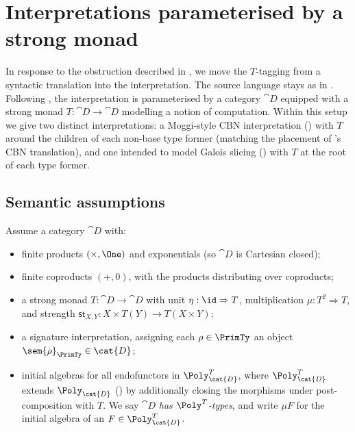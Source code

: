 \section{Interpretations parameterised by a strong monad}
\label{sec:slicing-interpretation}

In response to the obstruction described in , we move the
$T$-tagging from a syntactic translation into the interpretation. The source language stays as in
. Following \citet{notions-of-computation}, the interpretation is
parameterised by a category $\cat{D}$ equipped with a strong monad $T : \cat{D} \to \cat{D}$
modelling a notion of computation. Within this setup we give two distinct interpretations: a Moggi-style CBN interpretation
() with $T$ around the children of each non-base type former
(matching the placement of 's CBN translation), and one intended
to model Galois slicing () with $T$ at the root of each type
former.

\subsection{Semantic assumptions}
\label{sec:slicing-interpretation:assumptions}

Assume a category $\cat{D}$ with:
\begin{itemize}
\item finite products $(\times, \One)$ and exponentials (so $\cat{D}$ is Cartesian closed);
\item finite coproducts $(+, 0)$, with the products distributing over coproducts;
\item a strong monad $T : \cat{D} \to \cat{D}$ with unit $\eta : \id \Rightarrow T$, multiplication
  $\mu : T^2 \Rightarrow T$, and strength $\mathsf{st}_{X,Y} : X \times T(Y) \to T(X \times Y)$;
\item a signature interpretation, assigning each $\rho \in \PrimTy$ an object
  $\sem{\rho}_{\PrimTy} \in \cat{D}$;
\item initial algebras for all endofunctors in $\Poly^T_{\cat{D}}$, where
  $\Poly^T_{\cat{D}}$ extends $\Poly_{\cat{D}}$ () by additionally
  closing the morphisms under post-composition with $T$. We say $\cat{D}$ \emph{has
  $\Poly^T$-types}, and write $\mu F$ for the initial algebra of an $F \in \Poly^T_{\cat{D}}$.
\end{itemize}

